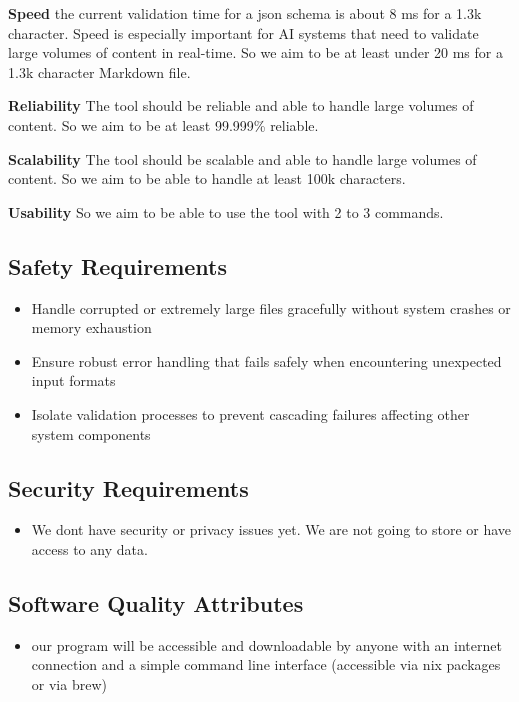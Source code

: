 \documentclass[
]{article}
\providecommand{\tightlist}{%
  \setlength{\itemsep}{0pt}\setlength{\parskip}{0pt}}\usepackage{longtable,booktabs,array}
\begin{document}
\textbf{Speed} the current validation time for a json schema is about 8
ms for a 1.3k character. Speed is especially important for AI systems
that need to validate large volumes of content in real-time. So we aim
to be at least under 20 ms for a 1.3k character Markdown file.

\textbf{Reliability} The tool should be reliable and able to handle
large volumes of content. So we aim to be at least 99.999\% reliable.

\textbf{Scalability} The tool should be scalable and able to handle
large volumes of content. So we aim to be able to handle at least 100k
characters.

\textbf{Usability} So we aim to be able to use the tool with 2 to 3
commands.

\subsection{Safety Requirements}\label{safety-requirements}

\begin{itemize}
\item
  Handle corrupted or extremely large files gracefully without system
  crashes or memory exhaustion
\item
  Ensure robust error handling that fails safely when encountering
  unexpected input formats
\item
  Isolate validation processes to prevent cascading failures affecting
  other system components
\end{itemize}

\subsection{Security Requirements}\label{security-requirements}

\begin{itemize}
\tightlist
\item
  We dont have security or privacy issues yet. We are not going to store
  or have access to any data.
\end{itemize}

\subsection{Software Quality
Attributes}\label{software-quality-attributes}

\begin{itemize}
\tightlist
\item
  our program will be accessible and downloadable by anyone with an
  internet connection and a simple command line interface (accessible
  via nix packages or via brew)
\end{itemize}
\end{document}

